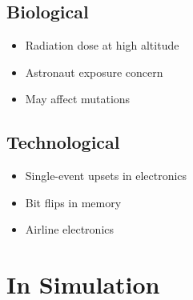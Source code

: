\documentclass[
  11pt,
  letterpaper,
  twoside,
  openright]{book}
\providecommand{\tightlist}{%
  \setlength{\itemsep}{0pt}\setlength{\parskip}{0pt}}
\begin{document}
\subsection{Biological}\label{biological}

\begin{itemize}
\tightlist
\item
  Radiation dose at high altitude
\item
  Astronaut exposure concern
\item
  May affect mutations
\end{itemize}

\subsection{Technological}\label{technological}

\begin{itemize}
\tightlist
\item
  Single-event upsets in electronics
\item
  Bit flips in memory
\item
  Airline electronics
\end{itemize}

\section{In Simulation}\label{in-simulation-24}
\end{document}
